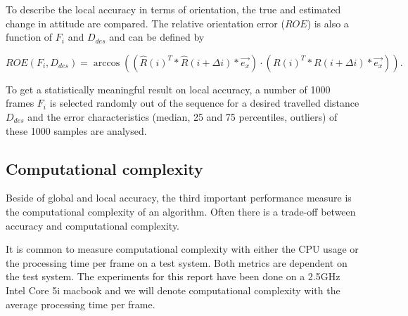 To describe the local accuracy in terms of orientation, the true and estimated change in attitude are compared. The relative orientation error ($ROE$) is also a function of $F_i$ and $D_{des}$ and can be defined by

\begin{equation}
ROE\left( F_i, D_{des} \right) = \arccos \left(\left( \hat{R} \left(i\right)^T * \hat{R} \left(i+\Delta i\right) * \vec{e_{x}} \right) \cdot \left( R \left(i\right)^T * R \left(i+\Delta i\right) * \vec{e_{x}} \right)\right) .
\end{equation}

To get a statistically meaningful result on local accuracy, a number of 1000 frames $F_i$ is selected randomly out of the sequence for a desired travelled distance $D_{des}$ and the error characteristics (median, 25 and 75 percentiles, outliers) of these 1000 samples are analysed.




\subsection{Computational complexity}
\label{sec:complexity}

Beside of global and local accuracy, the third important performance measure is the computational complexity of an algorithm. Often there is a trade-off between accuracy and computational complexity.

It is common to measure computational complexity with either the CPU usage or the processing time per frame on a test system. Both metrics are dependent on the test system. The experiments for this report have been done on a 2.5GHz Intel Core 5i macbook and we will denote computational complexity with the average processing time per frame.











